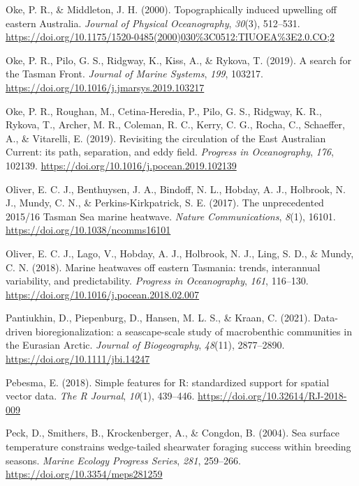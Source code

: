 \documentclass{article}
\newlength{\cslhangindent}
\newlength{\cslentryspacingunit} %
\newenvironment{CSLReferences}[2] %
 {%
  \setlength{\parindent}{0pt}
  \ifodd #1
  \let\oldpar\par
  \def\par{\hangindent=\cslhangindent\oldpar}
  \fi
  \setlength{\parskip}{#2\cslentryspacingunit}
 }%
 {}
\begin{document}
\begin{linenumbers}
\begin{CSLReferences}{1}{0}
\leavevmode{}%
Oke, P. R., \& Middleton, J. H. (2000). Topographically induced upwelling off eastern Australia. \emph{Journal of Physical Oceanography}, \emph{30}(3), 512--531. \url{https://doi.org/10.1175/1520-0485(2000)030\%3C0512:TIUOEA\%3E2.0.CO;2}

\leavevmode{}%
Oke, P. R., Pilo, G. S., Ridgway, K., Kiss, A., \& Rykova, T. (2019). A search for the Tasman Front. \emph{Journal of Marine Systems}, \emph{199}, 103217. \url{https://doi.org/10.1016/j.jmarsys.2019.103217}

\leavevmode{}%
Oke, P. R., Roughan, M., Cetina-Heredia, P., Pilo, G. S., Ridgway, K. R., Rykova, T., Archer, M. R., Coleman, R. C., Kerry, C. G., Rocha, C., Schaeffer, A., \& Vitarelli, E. (2019). Revisiting the circulation of the East Australian Current: its path, separation, and eddy field. \emph{Progress in Oceanography}, \emph{176}, 102139. \url{https://doi.org/10.1016/j.pocean.2019.102139}

\leavevmode{}%
Oliver, E. C. J., Benthuysen, J. A., Bindoff, N. L., Hobday, A. J., Holbrook, N. J., Mundy, C. N., \& Perkins-Kirkpatrick, S. E. (2017). The unprecedented 2015/16 Tasman Sea marine heatwave. \emph{Nature Communications}, \emph{8}(1), 16101. \url{https://doi.org/10.1038/ncomms16101}

\leavevmode{}%
Oliver, E. C. J., Lago, V., Hobday, A. J., Holbrook, N. J., Ling, S. D., \& Mundy, C. N. (2018). Marine heatwaves off eastern Tasmania: trends, interannual variability, and predictability. \emph{Progress in Oceanography}, \emph{161}, 116--130. \url{https://doi.org/10.1016/j.pocean.2018.02.007}

\leavevmode{}%
Pantiukhin, D., Piepenburg, D., Hansen, M. L. S., \& Kraan, C. (2021). Data-driven bioregionalization: a seascape-scale study of macrobenthic communities in the Eurasian Arctic. \emph{Journal of Biogeography}, \emph{48}(11), 2877--2890. \url{https://doi.org/10.1111/jbi.14247}

\leavevmode{}%
Pebesma, E. (2018). {Simple features for R: standardized support for spatial vector data}. \emph{{The R Journal}}, \emph{10}(1), 439--446. \url{https://doi.org/10.32614/RJ-2018-009}

\leavevmode{}%
Peck, D., Smithers, B., Krockenberger, A., \& Congdon, B. (2004). Sea surface temperature constrains wedge-tailed shearwater foraging success within breeding seasons. \emph{Marine Ecology Progress Series}, \emph{281}, 259--266. \url{https://doi.org/10.3354/meps281259}


\end{CSLReferences}
\end{linenumbers}
\end{document}
